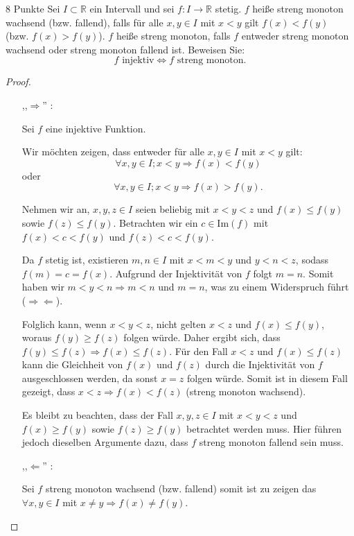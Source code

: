\documentclass{../problemset}
\begin{document}
\begin{problem}{8 Punkte}
Sei $I \subset \mathbb{R}$ ein Intervall und sei $f : I \to \mathbb{R}$ stetig. $f$ heiße streng monoton wachsend (bzw. fallend), falls für alle $x, y \in I$ mit $x < y$ gilt $f(x) < f(y)$ (bzw. $f(x) > f(y)$). $f$ heiße streng monoton, falls $f$ entweder streng monoton wachsend oder streng monoton fallend ist. Beweisen Sie:
\[f \text{ injektiv} \iff f \text{ streng monoton}.\]
\begin{proof}
	$ $

	\begin{itemize}
		\item [,,$\Longrightarrow$'']:

		      Sei $f$ eine injektive Funktion.

		      Wir möchten zeigen, dass entweder für alle $x, y \in I$ mit $x < y$ gilt:
		      \[
			      \forall x, y \in I; x < y \Rightarrow f(x) < f(y)
		      \]
		      oder
		      \[
			      \forall x, y \in I; x < y \Rightarrow f(x) > f(y).
		      \]

		      Nehmen wir an, $x, y, z \in I$ seien beliebig mit $x < y < z$ und $f(x) \leq f(y)$ sowie $f(z) \leq f(y)$.
		      Betrachten wir ein $c \in \text{Im}(f)$ mit $f(x) < c < f(y)$ und $f(z) < c < f(y)$.

		      Da $f$ stetig ist, existieren $m, n \in I$ mit $x < m < y$ und $y < n < z$, sodass $f(m) = c = f(x)$.
		      Aufgrund der Injektivität von $f$ folgt $m = n$.
		      Somit haben wir $m < y < n \Rightarrow m < n$ und $m = n$, was zu einem Widerspruch führt ($\Rightarrow\Leftarrow$).

		      Folglich kann, wenn $x < y < z$, nicht gelten $x < z$ und $f(x) \leq f(y)$, woraus $f(y) \geq f(z)$ folgen würde.
		      Daher ergibt sich, dass $f(y) \leq f(z) \Rightarrow f(x) \leq f(z)$.
		      Für den Fall $x < z$ und $f(x) \leq f(z)$ kann die Gleichheit von $f(x)$ und $f(z)$ durch die Injektivität von $f$ ausgeschlossen werden, da sonst $x = z$ folgen würde. Somit ist in diesem Fall gezeigt, dass $x < z \Rightarrow f(x) < f(z)$ (streng monoton wachsend).

		      Es bleibt zu beachten, dass der Fall $x, y, z \in I$ mit $x < y < z$ und $f(x) \geq f(y)$ sowie $f(z) \geq f(y)$ betrachtet werden muss. Hier führen jedoch dieselben Argumente dazu, dass $f$ streng monoton fallend sein muss.
		\item [,,$\Longleftarrow$'']:

		      Sei $f$ streng monoton wachsend (bzw. fallend) somit ist zu zeigen das $\forall x, y \in I$ mit $x \neq y \Rightarrow f(x) \ne f(y)$.


\end{itemize}
\end{proof}
\end{problem}
\end{document}
